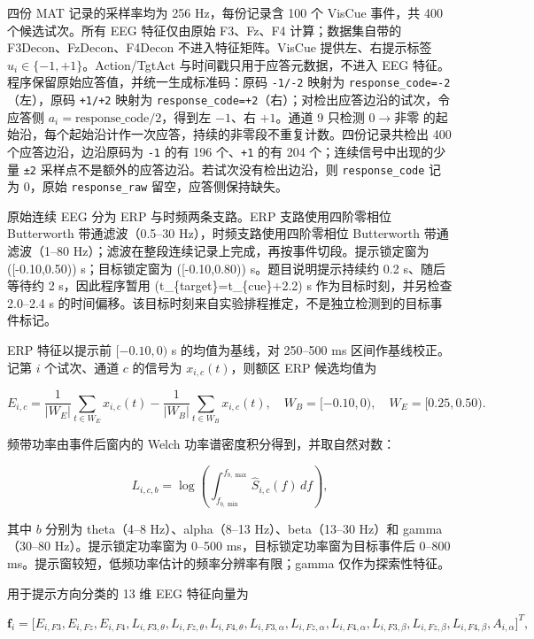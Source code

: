 四份 MAT 记录的采样率均为 256 Hz，每份记录含 100 个 VisCue 事件，共 400
个候选试次。所有 EEG 特征仅由原始 F3、Fz、F4 计算；数据集自带的
F3Decon、FzDecon、F4Decon 不进入特征矩阵。VisCue 提供左、右提示标签
\(u_i\in\{-1,+1\}\)。Action/TgtAct 与时间戳只用于应答元数据，不进入 EEG
特征。程序保留原始应答值，并统一生成标准码：原码 \texttt{-1/-2} 映射为
\texttt{response\_code=-2}（左），原码 \texttt{+1/+2} 映射为
\texttt{response\_code=+2}（右）；对检出应答边沿的试次，令应答侧
\(a_i=\text{response\_code}/2\)，得到左 \(-1\)、右 \(+1\)。通道 9 只检测
\(0\to\text{非零}\)
的起始沿，每个起始沿计作一次应答，持续的非零段不重复计数。四份记录共检出
400 个应答边沿，边沿原码为 \texttt{-1} 的有 196 个、\texttt{+1} 的有 204
个；连续信号中出现的少量 \texttt{±2}
采样点不是额外的应答边沿。若试次没有检出边沿，则 \texttt{response\_code}
记为 0，原始 \texttt{response\_raw} 留空，应答侧保持缺失。

原始连续 EEG 分为 ERP 与时频两条支路。ERP 支路使用四阶零相位 Butterworth
带通滤波（0.5--30 Hz），时频支路使用四阶零相位 Butterworth
带通滤波（1--80
Hz）；滤波在整段连续记录上完成，再按事件切段。提示锁定窗为
({[}-0.10,0.50)) s；目标锁定窗为 ({[}-0.10,0.80)) s。题目说明提示持续约
0.2 s、随后等待约 2 s，因此程序暂用 (t\_\{target\}=t\_\{cue\}+2.2) s
作为目标时刻，并另检查 2.0--2.4 s
的时间偏移。该目标时刻来自实验排程推定，不是独立检测到的目标事件标记。

ERP 特征以提示前 \([-0.10,0)\) s 的均值为基线，对 250--500 ms
区间作基线校正。记第 \(i\) 个试次、通道 \(c\) 的信号为
\(x_{i,c}(t)\)，则额区 ERP 候选均值为

\[
E_{i,c}=\frac{1}{|W_E|}\sum_{t\in W_E}x_{i,c}(t)-\frac{1}{|W_B|}\sum_{t\in W_B}x_{i,c}(t),
\quad W_B=[-0.10,0),\quad W_E=[0.25,0.50).
\]

频带功率由事件后窗内的 Welch 功率谱密度积分得到，并取自然对数：

\[
L_{i,c,b}=\log\left(\int_{f_{b,\min}}^{f_{b,\max}}\widehat S_{i,c}(f)\,df\right),
\]

其中 \(b\) 分别为 theta（4--8 Hz）、alpha（8--13 Hz）、beta（13--30
Hz）和 gamma（30--80 Hz）。提示锁定功率窗为 0--500
ms，目标锁定功率窗为目标事件后 0--800
ms。提示窗较短，低频功率估计的频率分辨率有限；gamma 仅作为探索性特征。

用于提示方向分类的 13 维 EEG 特征向量为

\[
\mathbf f_i=\big[E_{i,F3},E_{i,Fz},E_{i,F4},
L_{i,F3,\theta},L_{i,Fz,\theta},L_{i,F4,\theta},
L_{i,F3,\alpha},L_{i,Fz,\alpha},L_{i,F4,\alpha},
L_{i,F3,\beta},L_{i,Fz,\beta},L_{i,F4,\beta},
A_{i,\alpha}\big]^T,
\]

